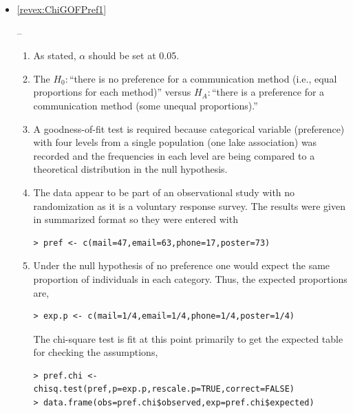 \documentclass[10pt,openany]{book}\usepackage[]{graphicx}\usepackage[]{color}
\makeatletter
\newenvironment{kframe}{%
 \def\at@end@of@kframe{}%
 \ifinner\ifhmode%
  \def\at@end@of@kframe{\end{minipage}}%
  \begin{minipage}{\columnwidth}%
 \fi\fi%
 \def\FrameCommand##1{\hskip\@totalleftmargin \hskip-\fboxsep
 \colorbox{shadecolor}{##1}\hskip-\fboxsep
     \hskip-\linewidth \hskip-\@totalleftmargin \hskip\columnwidth}%
 \MakeFramed {\advance\hsize-\width
   \@totalleftmargin\z@ \linewidth\hsize
   \@setminipage}}%
 {\par\unskip\endMakeFramed%
 \at@end@of@kframe}
\newenvironment{knitrout}{}{} %
\makeatother
\begin{document}
\begin{itemize}
  \item \hypertarget{ans:ChiGOFPref1}{\ref{revex:ChiGOFPref1}} --
    \begin{enumerate}
      \item As stated, $\alpha$ should be set at 0.05.
      \item The $H_{0}:$``there is no preference for a communication method (i.e., equal proportions for each method)'' versus $H_{A}:$``there is a preference for a communication method (some unequal proportions).''
      \item A goodness-of-fit test is required because categorical variable (preference) with four levels from a single population (one lake association) was recorded and the frequencies in each level are being compared to a theoretical distribution in the null hypothesis.
      \item The data appear to be part of an observational study with no randomization as it is a voluntary response survey.  The results were given in summarized format so they were entered with
\begin{knitrout}
\color{fgcolor}\begin{kframe}
\begin{verbatim}
> pref <- c(mail=47,email=63,phone=17,poster=73)
\end{verbatim}
\end{kframe}
\end{knitrout}
      \item Under the null hypothesis of no preference one would expect the same proportion of individuals in each category.  Thus, the expected proportions are,
\begin{knitrout}
\color{fgcolor}\begin{kframe}
\begin{verbatim}
> exp.p <- c(mail=1/4,email=1/4,phone=1/4,poster=1/4)
\end{verbatim}
\end{kframe}
\end{knitrout}
The chi-square test is fit at this point primarily to get the expected table for checking the assumptions,
\begin{knitrout}
\color{fgcolor}\begin{kframe}
\begin{verbatim}
> pref.chi <- chisq.test(pref,p=exp.p,rescale.p=TRUE,correct=FALSE)
> data.frame(obs=pref.chi$observed,exp=pref.chi$expected)

\end{verbatim}
\end{kframe}
\end{knitrout}
\end{enumerate}
\end{itemize}
\end{document}
